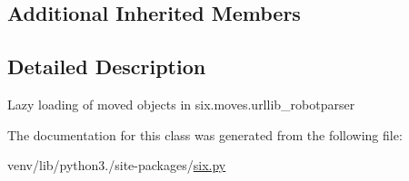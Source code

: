 \subsection*{Additional Inherited Members}


\subsection{Detailed Description}
\begin{DoxyVerb}Lazy loading of moved objects in six.moves.urllib_robotparser\end{DoxyVerb}
 

The documentation for this class was generated from the following file\+:\begin{DoxyCompactItemize}
\item 
venv/lib/python3./site-\/packages/\hyperlink{six_8py}{six.\+py}\end{DoxyCompactItemize}

